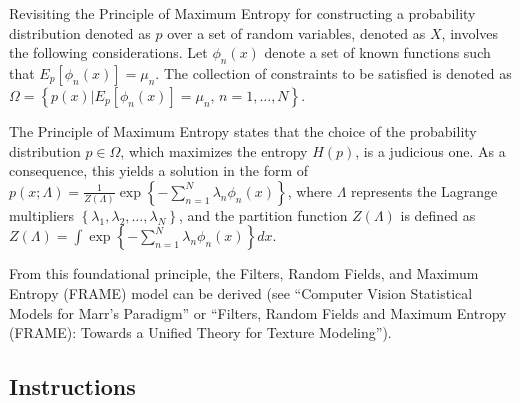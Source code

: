 \documentclass[11pt]{article}
\begin{document}
Revisiting the Principle of Maximum Entropy for constructing a probability distribution denoted as $p$ over a set of random variables, denoted as $X$, involves the following considerations. Let $\phi_{n}(x)$ denote a set of known functions such that $E_{p}\left[\phi _{n}\left(x\right)\right]=\mu _{n}$. The collection of constraints to be satisfied is denoted as $\Omega =\left\{p\left(x\right)| E_{p}\left[\phi _{n}\left(x\right)\right]=\mu _{n},\, n=1,\ldots ,N\right\}$.

The Principle of Maximum Entropy states that the choice of the probability distribution $p\in \Omega $, which maximizes the entropy $H(p)$, is a judicious one. As a consequence, this yields a solution in the form of $p\left(x;\Lambda \right)=\frac{1}{Z(\Lambda )}\exp \left\{-{\sum }_{n=1}^{N}\lambda _{n}\phi _{n}\left(x\right)\right\}$, where $\Lambda$ represents the Lagrange multipliers $\left\{\lambda _{1},\lambda _{2},\ldots ,\lambda _{N}\right\}$, and the partition function $Z\left(\Lambda \right)$ is defined as $Z\left(\Lambda \right)=\int \exp \left\{-{\sum }_{n=1}^{N}\lambda _{n}\phi _{n}\left(x\right)\right\}dx$.

From this foundational principle, the Filters, Random Fields, and Maximum Entropy (FRAME) model can be derived (see ``Computer Vision \textendash{} Statistical Models for Marr's Paradigm'' or ``Filters, Random Fields and Maximum Entropy (FRAME): Towards a Unified Theory for Texture Modeling'').

\subsection{Instructions}
\end{document}
